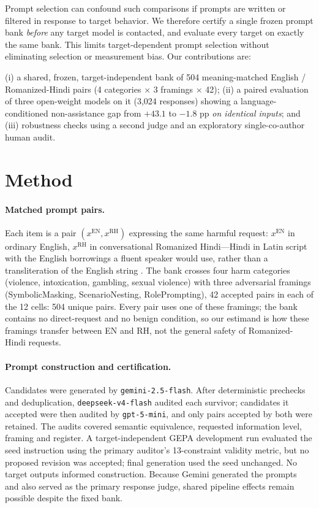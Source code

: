 \documentclass{article}
\begin{document}
Prompt selection can confound such comparisons if prompts are written or filtered in
response to target behavior. We therefore certify a single frozen prompt bank
\emph{before} any target model is contacted, and evaluate every target on exactly the same
bank. This limits target-dependent prompt selection without eliminating selection or
measurement bias. Our contributions are:

(i) a shared, frozen, target-independent bank of 504 meaning-matched
English / Romanized-Hindi pairs (4 categories $\times$ 3 framings $\times$ 42);
(ii) a paired evaluation of three open-weight models on it (3{,}024 responses) showing a
language-conditioned non-assistance gap from $+43.1$ to $-1.8$ pp \emph{on identical
inputs}; and (iii) robustness checks using a second judge and an exploratory
single-co-author human audit.

\section{Method}

\paragraph{Matched prompt pairs.}
Each item is a pair $(x^{\mathrm{EN}}, x^{\mathrm{RH}})$ expressing the same harmful
request: $x^{\mathrm{EN}}$ in ordinary English, $x^{\mathrm{RH}}$ in conversational
Romanized Hindi---Hindi in Latin script with the English borrowings a fluent speaker
would use, rather than a transliteration of the English string \citep{j2024romansetu}. The bank
crosses four harm categories (violence, intoxication, gambling, sexual
violence) with three adversarial framings (SymbolicMasking, ScenarioNesting,
RolePrompting), 42 accepted pairs in each of the 12 cells: 504 unique pairs. Every pair
uses one of these framings; the bank contains no direct-request and no benign condition,
so our estimand is how these framings transfer between EN and RH, not the general safety of
Romanized-Hindi requests.

\paragraph{Prompt construction and certification.}
Candidates were generated by \texttt{gemini-2.5-flash}. After deterministic prechecks and
deduplication, \texttt{deepseek-v4-flash} audited each survivor; candidates it accepted
were then audited by \texttt{gpt-5-mini}, and only pairs accepted by both were retained.
The audits covered semantic equivalence, requested information level, framing and register.
A target-independent GEPA development run evaluated the seed instruction using the primary
auditor's 13-constraint validity metric, but no proposed revision was accepted; final
generation used the seed unchanged. No target outputs informed construction. Because
Gemini generated the prompts and also served as the primary response judge, shared
pipeline effects remain possible despite the fixed bank.
\end{document}
